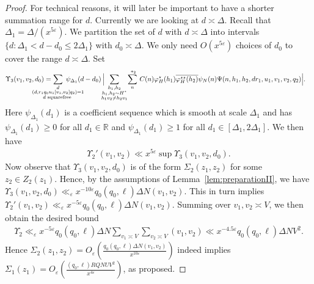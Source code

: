 \documentclass{amsart}
\numberwithin{equation}{section}
\begin{document}
\begin{proof}
For technical reasons, it will later be important to have a shorter summation range for $d$. Currently we are looking at $d \asymp \Delta$.  Recall that $\Delta_1 = \Delta/( x^{5\varepsilon})$. We partition the set of $d$ with $d \asymp \Delta$ into intervals  $\{d: \Delta_1 < d-d_0\leq 2\Delta_1\}$ with $d_0 \asymp \Delta$. We only need $O(x^{5\varepsilon})$ choices of $d_0$ to cover the  range $d \asymp \Delta$.  Set 
 \begin{align*}
\Upsilon_3(v_1,v_2,d_0) = \!\!\!\!\!\!\!\!\!\!\!\!\!\!\!\!\!\!&\sum_{\substack{d  \\ (d,r_1q_0u_1[v_1,v_2]q_2)=1 \\ d \mbox{\begin{scriptsize}
squarefree
\end{scriptsize}}}} \!\!\!\!\!\!\!\!\!\!\!\!\!\!\!\!\!\psi_{\Delta_1}(d-d_0)\, \Big|\!\!\!\! \sum_{\substack{h_1, h_2 \\ h_1, h_2 \sim H^*  \\ h_1 v_2 \neq h_2v_1 }}  \!\sum_{\substack{n }}^{\,\,*_2}\,C(n)\varphi_H^\star(h_1) \overline{\varphi_H^{\star\star}(h_2)}\psi_N(n)  \Psi(n,h_1,h_2,dr_1,u_1,v_1,v_2,q_2) \Big|.
\end{align*}
Here  $\psi_{\Delta_1}(d_1)$ is a coefficient sequence which is smooth at scale $\Delta_1$ and has $\psi_{\Delta_1}(d_1) \geq 0$ for all $d_1 \in \mathbb{R}$ and $\psi_{\Delta_1}(d_1) \geq 1$ for all $d_1 \in [\Delta_1,2\Delta_1]$. We then have 
\begin{align*}
\Upsilon_2'(v_1,v_2) \ll x^{5\varepsilon} \sup \Upsilon_3(v_1,v_2,d_0).
\end{align*}
Now observe that $\Upsilon_3(v_1,v_2,d_0)$ is of the form $\Sigma_2(z_1,z_2)$ for some $z_2 \in Z_2(z_1)$. Hence, by the assumptions of Lemma~\ref{lem:preparationII}, we have  $ \Upsilon_3(v_1,v_2,d_0) \ll_{\varepsilon} x^{-10\varepsilon}q_0(q_0,\ell)\Delta N  (v_1,v_2)$. This in turn implies  $\Upsilon_2'(v_1,v_2) \ll_{\varepsilon} x^{-5\varepsilon}q_0(q_0,\ell)\Delta N (v_1,v_2) $. Summing over  $v_1, v_2 \asymp V$, we then obtain the desired bound
\begin{align*}
\Upsilon_2 \ll_{\varepsilon}  x^{-5\varepsilon}q_0(q_0,\ell)\Delta N  \sum_{v_1 \asymp V} \sum_{v_2 \asymp V}(v_1,v_2)\ll x^{-4.5\varepsilon}q_0(q_0,\ell)\Delta N  V^2.
\end{align*} 
Hence $\Sigma_2(z_1,z_2) = O_{\varepsilon}(\frac{q_0(q_0,\ell)\Delta N (v_1,v_2)}{x^{10\varepsilon}})$ indeed implies $\Sigma_1(z_1) = O_{\varepsilon}(\frac{(q_0,\ell)RQNUV^2}{x^{4\varepsilon}})$, as proposed.
\end{proof}
\end{document}
